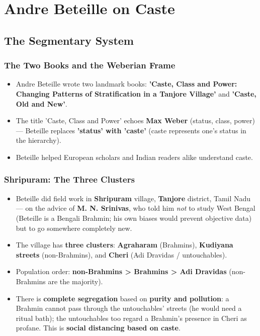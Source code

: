 \chapter{Andre Beteille on Caste}

\section{The Segmentary System}

\subsection{The Two Books and the Weberian Frame}

\begin{KeyConcept}
\begin{itemize}
\item Andre Beteille wrote two landmark books: \textbf{'Caste, Class and Power: Changing Patterns of Stratification in a Tanjore Village'} and \textbf{'Caste, Old and New'}.
\item The title 'Caste, Class and Power' echoes \textbf{Max Weber} (status, class, power) --- Beteille replaces \textbf{'status' with 'caste'} (caste represents one's status in the hierarchy).
\item Beteille helped European scholars and Indian readers alike understand caste.
\end{itemize}
\end{KeyConcept}

\subsection{Shripuram: The Three Clusters}

\begin{ExampleBox}
\begin{itemize}
\item Beteille did field work in \textbf{Shripuram} village, \textbf{Tanjore} district, Tamil Nadu --- on the advice of \textbf{M. N. Srinivas}, who told him \emph{not} to study West Bengal (Beteille is a Bengali Brahmin; his own biases would prevent objective data) but to go somewhere completely new.
\item The village has \textbf{three clusters}: \textbf{Agraharam} (Brahmins), \textbf{Kudiyana streets} (non-Brahmins), and \textbf{Cheri} (Adi Dravidas / untouchables).
\item Population order: \textbf{non-Brahmins > Brahmins > Adi Dravidas} (non-Brahmins are the majority).
\item There is \textbf{complete segregation} based on \textbf{purity and pollution}: a Brahmin cannot pass through the untouchables' streets (he would need a ritual bath); the untouchables too regard a Brahmin's presence in Cheri as profane. This is \textbf{social distancing based on caste}.
\end{itemize}
\end{ExampleBox}

